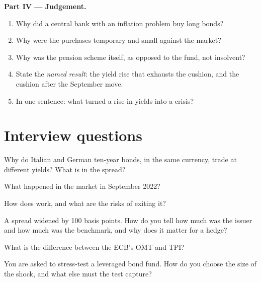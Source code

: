 \begin{problem}
\medskip\noindent\textbf{Part IV --- Judgement.}
\begin{enumerate}[resume]
\item Why did a central bank with an inflation problem buy long bonds?
\item Why were the purchases temporary and small against the market?
\item Why was the pension scheme itself, as opposed to the fund, not insolvent?
\item State the \emph{named result}: the yield rise that exhausts the cushion,
and the cushion after the September move.
\item In one sentence: what turned a rise in yields into a crisis?
\end{enumerate}
\end{problem}

\section{Interview questions}

\begin{interviewq}\label{iq:m2:european-and-japanese-government-bonds:1}
Why do Italian and German ten-year bonds, in the same currency, trade at
different yields? What is in the spread?
\end{interviewq}

\begin{interviewq}\label{iq:m2:european-and-japanese-government-bonds:2}
What happened in the  market in September 2022?
\end{interviewq}

\begin{interviewq}\label{iq:m2:european-and-japanese-government-bonds:3}
How does  work, and what are the risks of exiting it?
\end{interviewq}

\begin{interviewq}\label{iq:m2:european-and-japanese-government-bonds:4}
A spread widened by 100 basis points. How do you tell how much was the issuer
and how much was the benchmark, and why does it matter for a hedge?
\end{interviewq}

\begin{interviewq}\label{iq:m2:european-and-japanese-government-bonds:5}
What is the difference between the ECB's OMT and TPI?
\end{interviewq}

\begin{interviewq}\label{iq:m2:european-and-japanese-government-bonds:6}
You are asked to stress-test a leveraged bond fund. How do you choose the size
of the shock, and what else must the test capture?
\end{interviewq}
